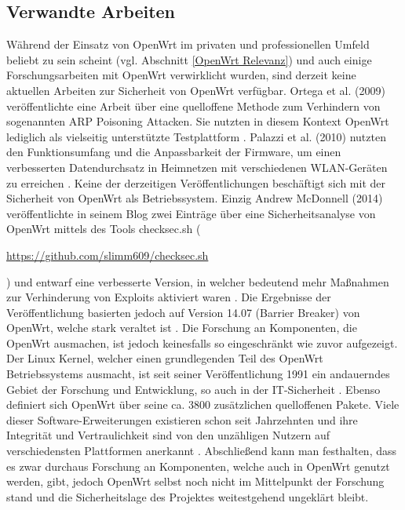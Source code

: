 \documentclass[a4paper]{book}
\begin{document}
\begin{large}
\section{Verwandte Arbeiten}
\begin{onehalfspace}
Während der Einsatz von OpenWrt im privaten und professionellen Umfeld beliebt zu sein scheint (vgl. Abschnitt \ref{OpenWrt Relevanz}) und auch einige Forschungsarbeiten mit OpenWrt verwirklicht wurden, sind derzeit keine aktuellen Arbeiten zur Sicherheit von OpenWrt verfügbar. Ortega et al. (2009) veröffentlichte eine Arbeit über eine quelloffene Methode zum Verhindern von sogenannten ARP Poisoning Attacken. Sie nutzten in diesem Kontext OpenWrt lediglich als vielseitig unterstützte Testplattform \cite{Ortega.19.10.200921.10.2009}. Palazzi et al. (2010) nutzten den Funktionsumfang und die Anpassbarkeit der Firmware, um einen verbesserten Datendurchsatz in Heimnetzen mit verschiedenen WLAN-Geräten zu erreichen \cite{Palazzi.19.07.201023.07.2010}. Keine der derzeitigen Veröffentlichungen beschäftigt sich mit der Sicherheit von OpenWrt als Betriebssystem. Einzig Andrew McDonnell (2014) veröffentlichte in seinem Blog zwei Einträge über eine Sicherheitsanalyse von OpenWrt mittels des Tools checksec.sh (\begin{small}\url{https://github.com/slimm609/checksec.sh}\end{small}) und entwarf eine verbesserte Version, in welcher bedeutend mehr Maßnahmen zur Verhinderung von Exploits aktiviert waren \cite{AndrewMcDonnell.2014}. Die Ergebnisse der Veröffentlichung basierten jedoch auf Version 14.07 (Barrier Breaker) von OpenWrt, welche stark veraltet ist \cite{OpenWrtWebseite.13.12.2020}.	\newline \indent
 	Die Forschung an Komponenten, die OpenWrt ausmachen, ist jedoch keinesfalls so eingeschränkt wie zuvor aufgezeigt. Der Linux Kernel, welcher einen grundlegenden Teil des OpenWrt Betriebssystems ausmacht, ist seit seiner Veröffentlichung 1991 ein andauerndes Gebiet der Forschung und Entwicklung, so auch in der IT-Sicherheit \cite{LinusTorvalds.1991, JonathanCorbet.2016, Chen.2011b, Jimenez.06.12.201609.12.2016}. Ebenso definiert sich OpenWrt über seine ca. 3800 zusätzlichen quelloffenen Pakete. \mbox Viele dieser Software-Erweiterungen existieren schon seit Jahrzehnten und ihre Integrität und Vertraulichkeit sind von den unzähligen Nutzern auf verschiedensten Plattformen anerkannt \cite{LennartBeringerAdamPetcheKatherineQ.YeAndrewW.Appel., Viega.2009, Barayuga.24.08.201527.08.2015}. Abschließend kann man festhalten, dass es zwar durchaus Forschung an Komponenten, welche auch in OpenWrt genutzt werden, gibt, jedoch OpenWrt selbst noch nicht im Mittelpunkt der Forschung stand und die Sicherheitslage des Projektes weitestgehend ungeklärt bleibt.


\end{onehalfspace}
\end{large}
\end{document}
